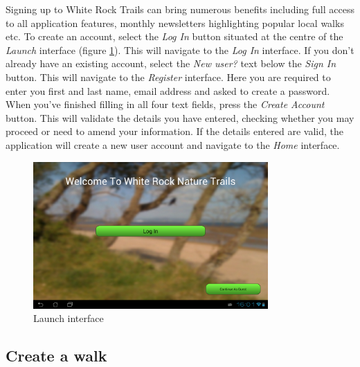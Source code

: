 \documentclass[11pt,a4paper]{report}
\begin{document}
Signing up to White Rock Trails can bring numerous benefits including full access to all application features, monthly newsletters highlighting popular local walks etc. To create an account, select the \emph{Log In} button situated at the centre of the \emph{Launch} interface (figure \ref{fig:launch_viewUM}). This will navigate to the \emph{Log In} interface. If you don't already have an existing account, select the \emph{New user?} text below the \emph{Sign In} button. This will navigate to the \emph{Register} interface. Here you are required to enter you first and last name, email address and asked to create a password. When you've finished filling in all four text fields, press the \emph{Create Account} button. This will validate the details you have entered, checking whether you may proceed or need to amend your information. If the details entered are valid, the application will create a new user account and navigate to the \emph{Home} interface.

\begin{figure}[H]
    \centering
    \includegraphics[width=0.8\textwidth]{chris/launch_view}
    \caption{Launch interface}
    \label{fig:launch_viewUM}
\end{figure}


\subsection{Create a walk}
\label{sec:create_walk}
\end{document}

